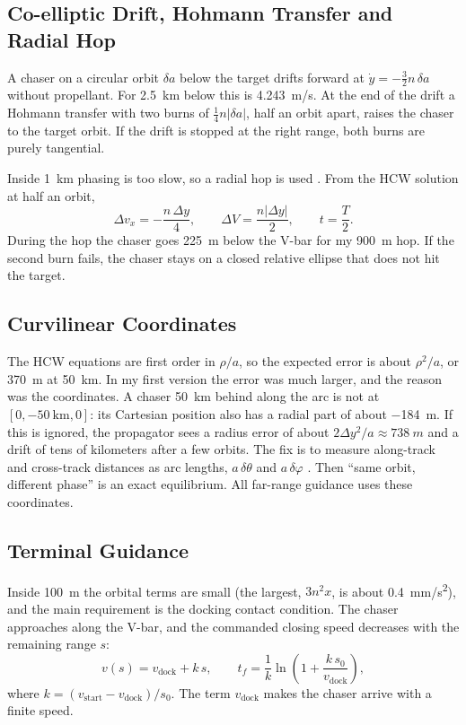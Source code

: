 \documentclass[letterpaper,10pt]{article}
\begin{document}
\subsection{Co-elliptic Drift, Hohmann Transfer and Radial Hop}

A chaser on a circular orbit $\delta a$ below the target drifts forward at
$\dot y = -\tfrac32 n\,\delta a$ without propellant. For \SI{2.5}{km} below
this is \SI{4.243}{m/s}. At the end of the drift a Hohmann transfer with
two burns of $\tfrac14 n|\delta a|$, half an orbit apart, raises the chaser
to the target orbit. If the drift is stopped at the right range, both burns
are purely tangential.

Inside \SI{1}{km} phasing is too slow, so a radial hop is used \cite{fehse}.
From the HCW solution at half an orbit,
\begin{equation}
  \Delta v_x = -\frac{n\,\Delta y}{4}, \qquad \Delta V = \frac{n|\Delta y|}{2}, \qquad t = \frac{T}{2}.
\end{equation}
During the hop the chaser goes \SI{225}{m} below the V-bar for my
\SI{900}{m} hop. If the second burn fails, the chaser stays on a closed
relative ellipse that does not hit the target.

\subsection{Curvilinear Coordinates}

The HCW equations are first order in $\rho/a$, so the expected error is about
$\rho^2/a$, or \SI{370}{m} at \SI{50}{km}. In my first version the error was
much larger, and the reason was the coordinates. A chaser \SI{50}{km} behind
along the arc is not at $[0, -50~\mathrm{km}, 0]$: its Cartesian position
also has a radial part of about \SI{-184}{m}. If this is ignored, the
propagator sees a radius error of about $2\Delta y^2/a \approx \SI{738}{m}$
and a drift of tens of kilometers after a few orbits. The fix is to measure
along-track and cross-track distances as arc lengths, $a\,\delta\theta$ and
$a\,\delta\varphi$ \cite{alfriend}. Then ``same orbit, different phase'' is an
exact equilibrium. All far-range guidance uses these coordinates.

\subsection{Terminal Guidance}

Inside \SI{100}{m} the orbital terms are small (the largest, $3n^2x$, is
about \SI{0.4}{mm/s^2}), and the main requirement is the docking contact
condition. The chaser approaches along the V-bar, and the commanded closing
speed decreases with the remaining range $s$:
\begin{equation}
  v(s) = v_{\mathrm{dock}} + k\,s, \qquad
  t_f = \frac{1}{k}\ln\!\left(1 + \frac{k\,s_0}{v_{\mathrm{dock}}}\right),
  \label{eq:glide}
\end{equation}
where $k = (v_{\mathrm{start}} - v_{\mathrm{dock}})/s_0$. The term
$v_{\mathrm{dock}}$ makes the chaser arrive with a finite speed.
\end{document}
